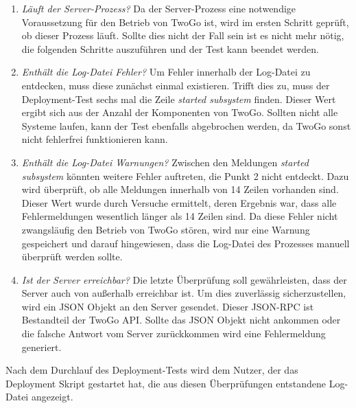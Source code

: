 \begin{enumerate}
\item \textit{Läuft der Server-Prozess?}
Da der Server-Prozess eine notwendige Voraussetzung für den Betrieb von TwoGo ist, wird im ersten Schritt geprüft, ob dieser Prozess läuft. Sollte dies nicht der Fall sein ist es nicht mehr nötig, die folgenden Schritte auszuführen und der Test kann beendet werden.
\item \textit{Enthält die Log-Datei Fehler?}
Um Fehler innerhalb der Log-Datei zu entdecken, muss diese zunächst einmal existieren. Trifft dies zu, muss der Deployment-Test sechs mal die Zeile \textit{started subsystem} finden. Dieser Wert ergibt sich aus der Anzahl der Komponenten von TwoGo. Sollten nicht alle Systeme laufen, kann der Test ebenfalls abgebrochen werden, da TwoGo sonst nicht fehlerfrei funktionieren kann.
\item \textit{Enthält die Log-Datei Warnungen?}
Zwischen den Meldungen \textit{started subsystem} könnten weitere Fehler auftreten, die Punkt 2 nicht entdeckt. Dazu wird überprüft, ob alle Meldungen innerhalb von 14 Zeilen vorhanden sind. Dieser Wert wurde durch Versuche ermittelt, deren Ergebnis war, dass alle Fehlermeldungen wesentlich länger als 14 Zeilen sind. Da diese Fehler nicht zwangsläufig den Betrieb von TwoGo stören, wird nur eine Warnung gespeichert und darauf hingewiesen, dass die Log-Datei des Prozesses manuell überprüft werden sollte.
\item \textit{Ist der Server erreichbar?}
Die letzte Überprüfung soll gewährleisten, dass der Server auch von außerhalb erreichbar ist. Um dies zuverlässig sicherzustellen, wird ein \acs{JSON} Objekt an den Server gesendet. Dieser \acs{JSON}-\acs{RPC} ist Bestandteil der TwoGo \acs{API}. Sollte das \acs{JSON} Objekt nicht ankommen oder die falsche Antwort vom Server zurückkommen wird eine Fehlermeldung generiert.
\end{enumerate}
Nach dem Durchlauf des Deployment-Tests wird dem Nutzer, der das Deployment Skript gestartet hat, die aus diesen Überprüfungen entstandene Log-Datei angezeigt.


